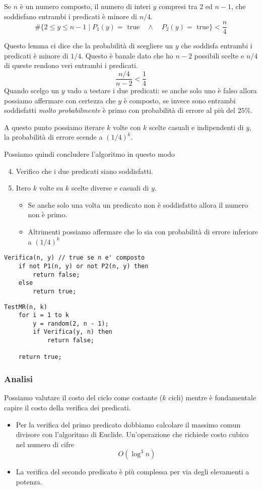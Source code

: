 \begin{lemma}
	Se $n$ \`e un numero composto, il numero di interi $y$ compresi tra 2 ed $n-1$, che soddisfano entrambi i predicati
	\`e minore di $n / 4$.
	\[ \# \{ 2 \leq y \leq n-1 \mid P_1(y) = \text{ true} \quad \wedge \quad P_2(y) = \text{ true} \} < \frac{n}{4} \]
\end{lemma}
Questo lemma ci dice che la probabilit\`a di scegliere un $y$ che soddisfa entrambi i predicati \`e minore di $1 / 4$.
Questo \`e banale dato che ho $n - 2$ possibili scelte e $n / 4$ di queste rendono veri entrambi i predicati.
\[ \frac{n/4}{n-2} < \frac{1}{4} \]
Quando scelgo un $y$ vado a testare i due predicati: se anche solo uno \`e falso allora possiamo affermare con certezza
che $y$ \`e composto, se invece sono entrambi soddisfatti \emph{molto probabilmente} \`e primo con probabilit\`a di
errore al pi\`u del $25\%$.

A questo punto possiamo iterare $k$ volte con $k$ scelte casuali e indipendenti di $y$, la probabilit\`a di errore scende
a $(1/4)^k$.

Possiamo quindi concludere l'algoritmo in questo modo
\begin{enumerate}
	\setcounter{enumi}{3}
	\item Verifico che i due predicati siano soddisfatti.
	\item Itero $k$ volte su $k$ scelte diverse e casuali di $y$.
	      \begin{itemize}
		      \item Se anche solo una volta un predicato non \`e soddisfatto allora il numero non \`e primo.
		      \item Altrimenti possiamo affermare che lo sia con probabilit\`a di errore inferiore a $(1/4)^k$
	      \end{itemize}
\end{enumerate}

\begin{lstlisting}[style=pseudo-style]
Verifica(n, y) // true se n e' composto
	if not P1(n, y) or not P2(n, y) then
		return false;
	else
		return true;
\end{lstlisting}

\begin{lstlisting}[style=pseudo-style]
TestMR(n, k)
	for i = 1 to k
		y = random(2, n - 1);
		if Verifica(y, n) then 
			return false;

	return true;
\end{lstlisting}

\subsubsection{Analisi}
Possiamo valutare il costo del ciclo come costante ($k$ cicli) mentre \`e fondamentale capire il costo della verifica
dei predicati.
\begin{itemize}
	\item Per la verifica del primo predicato dobbiamo calcolare il massimo comun divisore con l'algoritmo di Euclide.
	      Un'operazione che richiede costo cubico nel numero di cifre
	      \[ O(\log^3 n) \]
	\item La verifica del secondo predicato \`e pi\`u complessa per via degli elevamenti a potenza.
\end{itemize}